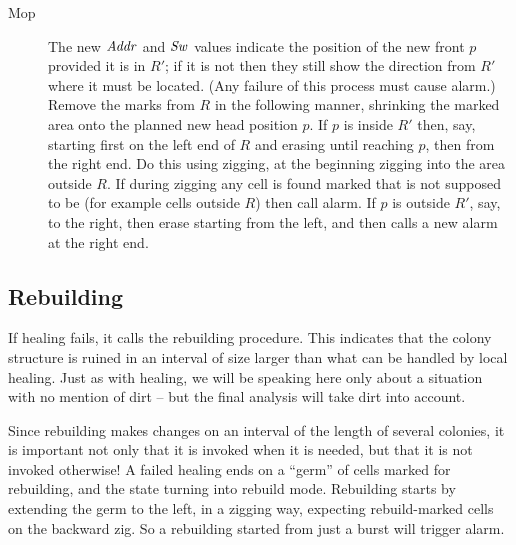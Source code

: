 \documentclass[12pt]{memoir}
\newcommand{\fld}[1]{\ensuremath{\textit{#1\/}}}
\newcommand{\R}{R}
\newcommand{\Addr}{\fld{Addr}}
\newcommand{\Sweep}{\fld{Sw}}
\begin{document}
\begin{description}
\item[Mop]
The new \( \Addr \) and \( \Sweep \) values indicate the position of
the new front \( p \) provided it is in \( R' \); if it is
not then they still show the direction from \( R' \) where it must be located.
(Any failure of this process must cause alarm.)
Remove the marks from \( \R \) in the following manner, shrinking
the marked area onto the planned new head position \( p \).
If \( p \) is inside \( R' \) then, say, starting
first on the left end of \( \R \) and erasing until reaching \( p \), then from the right end.
Do this using zigging, at the beginning zigging into the area outside \( \R \).
If during zigging any cell is found marked that is not supposed to be 
(for example cells outside \( \R \)) then call alarm.  
If \( p \) is outside \( R' \), say, to the right, then erase starting from the left,
and then calls a new alarm at the right end.

\end{description}


\subsection{Rebuilding}\label{sec:rebuilding}

If healing fails, it calls the rebuilding procedure.
This indicates that the colony structure is ruined in an interval of size larger than 
what can be handled by local healing.
Just as with healing, we will be speaking here only about a situation with no 
mention of dirt -- but the final analysis will take dirt into account.

Since rebuilding makes changes on an interval of the length of several colonies,
it is important not only that it is invoked when it is needed, but that it is not
invoked otherwise!
A failed healing ends on a ``germ'' of cells marked for rebuilding,
and the state turning into rebuild mode.
Rebuilding starts by extending the germ to the left, in a zigging way,
expecting rebuild-marked cells on the backward zig.
So a rebuilding started from just a burst will trigger alarm.
\end{document}
